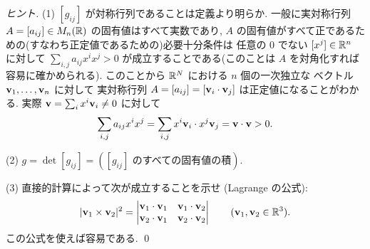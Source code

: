 \documentclass[12pt,twoside]{jarticle}
\begin{document}
\begin{proof}[ヒント]
 (1) $[g_{ij}]$ が対称行列であることは定義より明らか.
 一般に実対称行列 $A=[a_{ij}]\in M_n({\mathbb R})$ の固有値はすべて実数であり, 
 $A$ の固有値がすべて正であるための(すなわち正定値であるための)必要十分条件は
 任意の $0$ でない $[x^j]\in{\mathbb R}^n$ に対して $\sum_{i,j}a_{ij}x^ix^j>0$ 
 が成立することである(このことは $A$ を対角化すれば容易に確かめられる). 
 このことから ${\mathbb R}^N$ における $n$ 個の一次独立な
 ベクトル ${\mathbf v}_1,\ldots,{\mathbf v}_n$ に対して
 実対称行列 $A=[a_{ij}]=[{\mathbf v}_i\cdot{\mathbf v}_j]$ は正定値になることがわかる. 
 実際 ${\mathbf v}=\sum_i x^i{\mathbf v}_i\ne 0$ に対して
 \begin{equation*}
  \sum_{i,j} a_{ij}x^ix^j
  = \sum_{i,j} x^i{\mathbf v}_i\cdot x^j{\mathbf v}_j
  = {\mathbf v}\cdot{\mathbf v} > 0.
 \end{equation*}

 (2) $g=\det[g_{ij}]=(\text{$[g_{ij}]$ のすべての固有値の積})$.

 (3) 直接的計算によって次が成立することを示せ (Lagrange の公式):
 \begin{equation*}
  |{\mathbf v}_1\times{\mathbf v}_2|^2 =
  \begin{vmatrix}
   {\mathbf v}_1\cdot{\mathbf v}_1 & {\mathbf v}_1\cdot{\mathbf v}_2 \\
   {\mathbf v}_2\cdot{\mathbf v}_1 & {\mathbf v}_2\cdot{\mathbf v}_2 \\
  \end{vmatrix}
  \qquad ({\mathbf v}_1,{\mathbf v}_2\in{\mathbb R}^3).
 \end{equation*}
 この公式を使えば容易である. \qed
\end{proof}
\end{document}
